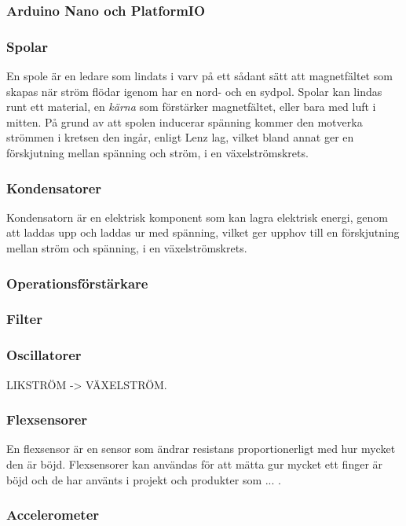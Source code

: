 \documentclass[a4paper]{article}
\begin{document}
\begin{sloppypar}
    \subsubsection{Arduino Nano och PlatformIO}
    \subsubsection{Spolar}
    En spole är en ledare som lindats i varv på ett sådant sätt att magnetfältet som skapas när ström flödar igenom har en nord- och en sydpol.
    Spolar kan lindas runt ett material, en \textit{kärna} som förstärker magnetfältet, eller bara med luft i mitten.
    På grund av att spolen inducerar spänning kommer den motverka strömmen i kretsen den ingår, enligt Lenz lag, vilket bland annat ger en förskjutning mellan spänning och ström, i en växelströmskrets.~\cite{digilar}

    \subsubsection{Kondensatorer}
    Kondensatorn är en elektrisk komponent som kan lagra elektrisk energi, genom att laddas upp och laddas ur med spänning, vilket ger upphov till en förskjutning mellan ström och spänning, i en växelströmskrets.~\cite{digilar}

    \subsubsection{Operationsförstärkare}
    \subsubsection{Filter}
    \subsubsection{Oscillatorer}
    LIKSTRÖM -> VÄXELSTRÖM.

    \subsubsection{Flexsensorer}
    En flexsensor är en sensor som ändrar resistans proportionerligt med hur mycket den är böjd.
    Flexsensorer kan användas för att mätta gur mycket ett finger är böjd och de har använts i projekt och produkter som ... .
    \subsubsection{Accelerometer}

\end{sloppypar}
\end{document}
